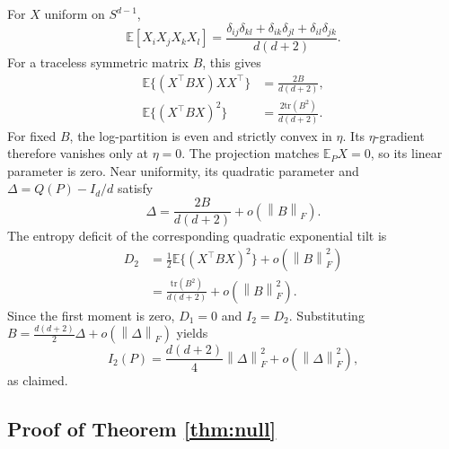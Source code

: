\documentclass[twoside]{article}
\theoremstyle{definition}
\theoremstyle{remark}
\newcommand{\E}{\mathbb E}
\newcommand{\tr}{\mathrm{tr}}
\newcommand{\norm}[1]{\left\lVert #1\right\rVert}
\begin{document}
For $X$ uniform on $S^{d-1}$,
\[
  \E[X_iX_jX_kX_l]
  =\frac{\delta_{ij}\delta_{kl}+\delta_{ik}\delta_{jl}+\delta_{il}\delta_{jk}}{d(d+2)}.
\]
For a traceless symmetric matrix $B$, this gives
\begin{align*}
  \E\{(X^\top BX)XX^\top\}&=\frac{2B}{d(d+2)},\\
  \E\{(X^\top BX)^2\}&=\frac{2\tr(B^2)}{d(d+2)}.
\end{align*}
For fixed $B$, the log-partition is even and strictly convex in $\eta$. Its $\eta$-gradient therefore vanishes only at $\eta=0$. The projection matches $\E_PX=0$, so its linear parameter is zero. Near uniformity, its quadratic parameter and $\Delta=Q(P)-I_d/d$ satisfy
\[
  \Delta=\frac{2B}{d(d+2)}+o(\norm{B}_F).
\]
The entropy deficit of the corresponding quadratic exponential tilt is
\[
\begin{aligned}
 D_2&=\tfrac12\E\{(X^\top BX)^2\}+o(\norm{B}_F^2)\\
 &=\frac{\tr(B^2)}{d(d+2)}+o(\norm{B}_F^2).
\end{aligned}
\]
Since the first moment is zero, $D_1=0$ and $I_2=D_2$. Substituting
$B=\frac{d(d+2)}{2}\Delta+o(\norm{\Delta}_F)$ yields
\[
  I_2(P)=\frac{d(d+2)}{4}\norm{\Delta}_F^2+o(\norm{\Delta}_F^2),
\]
as claimed.

\subsection{Proof of Theorem \ref{thm:null}}
\end{document}
